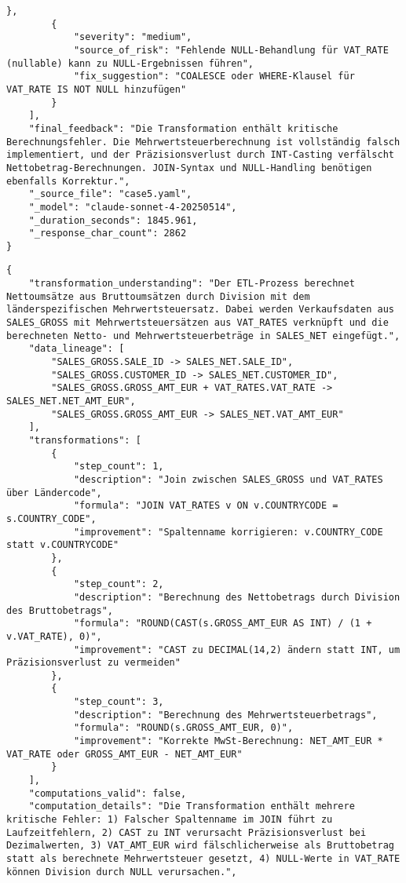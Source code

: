 \begin{lstlisting}[caption={Ausgabe: Claude Sonnet 4 Anwendungsfall 5 Konsistenzdurchlauf},label={claude_case5_prompt2}]
        },
        {
            "severity": "medium",
            "source_of_risk": "Fehlende NULL-Behandlung für VAT_RATE (nullable) kann zu NULL-Ergebnissen führen",
            "fix_suggestion": "COALESCE oder WHERE-Klausel für VAT_RATE IS NOT NULL hinzufügen"
        }
    ],
    "final_feedback": "Die Transformation enthält kritische Berechnungsfehler. Die Mehrwertsteuerberechnung ist vollständig falsch implementiert, und der Präzisionsverlust durch INT-Casting verfälscht Nettobetrag-Berechnungen. JOIN-Syntax und NULL-Handling benötigen ebenfalls Korrektur.",
    "_source_file": "case5.yaml",
    "_model": "claude-sonnet-4-20250514",
    "_duration_seconds": 1845.961,
    "_response_char_count": 2862
}
\end{lstlisting}

\begin{lstlisting}[caption={Ausgabe: Claude Sonnet 4 Anwendungsfall 5 Robustheitsdurchlauf},label={claude_case5_prompt3}]
{
    "transformation_understanding": "Der ETL-Prozess berechnet Nettoumsätze aus Bruttoumsätzen durch Division mit dem länderspezifischen Mehrwertsteuersatz. Dabei werden Verkaufsdaten aus SALES_GROSS mit Mehrwertsteuersätzen aus VAT_RATES verknüpft und die berechneten Netto- und Mehrwertsteuerbeträge in SALES_NET eingefügt.",
    "data_lineage": [
        "SALES_GROSS.SALE_ID -> SALES_NET.SALE_ID",
        "SALES_GROSS.CUSTOMER_ID -> SALES_NET.CUSTOMER_ID",
        "SALES_GROSS.GROSS_AMT_EUR + VAT_RATES.VAT_RATE -> SALES_NET.NET_AMT_EUR",
        "SALES_GROSS.GROSS_AMT_EUR -> SALES_NET.VAT_AMT_EUR"
    ],
    "transformations": [
        {
            "step_count": 1,
            "description": "Join zwischen SALES_GROSS und VAT_RATES über Ländercode",
            "formula": "JOIN VAT_RATES v ON v.COUNTRYCODE = s.COUNTRY_CODE",
            "improvement": "Spaltenname korrigieren: v.COUNTRY_CODE statt v.COUNTRYCODE"
        },
        {
            "step_count": 2,
            "description": "Berechnung des Nettobetrags durch Division des Bruttobetrags",
            "formula": "ROUND(CAST(s.GROSS_AMT_EUR AS INT) / (1 + v.VAT_RATE), 0)",
            "improvement": "CAST zu DECIMAL(14,2) ändern statt INT, um Präzisionsverlust zu vermeiden"
        },
        {
            "step_count": 3,
            "description": "Berechnung des Mehrwertsteuerbetrags",
            "formula": "ROUND(s.GROSS_AMT_EUR, 0)",
            "improvement": "Korrekte MwSt-Berechnung: NET_AMT_EUR * VAT_RATE oder GROSS_AMT_EUR - NET_AMT_EUR"
        }
    ],
    "computations_valid": false,
    "computation_details": "Die Transformation enthält mehrere kritische Fehler: 1) Falscher Spaltenname im JOIN führt zu Laufzeitfehlern, 2) CAST zu INT verursacht Präzisionsverlust bei Dezimalwerten, 3) VAT_AMT_EUR wird fälschlicherweise als Bruttobetrag statt als berechnete Mehrwertsteuer gesetzt, 4) NULL-Werte in VAT_RATE können Division durch NULL verursachen.",

\end{lstlisting}
